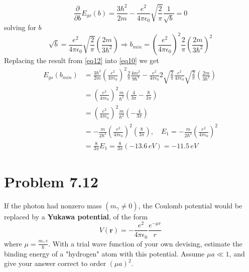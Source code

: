 \documentclass[12 pt]{article}
\numberwithin{equation}{section}
\begin{document}
\begin{enumerate}
  \begin{equation}\label{eq11}
    \frac{\partial}{\partial b} E_{gs}(b) = \frac{3\hbar^2}{2m} - \frac{e^2}{4\pi\epsilon_0}
    \sqrt{\frac{2}{\pi}}\frac{1}{\sqrt{b}} = 0
  \end{equation}
  solving for $b$
  \begin{equation}\label{eq12}
    \sqrt{b} = \frac{e^2}{4\pi\epsilon_0}\sqrt{\frac{2}{\pi}}\left(\frac{2m}{3\hbar^2}\right)
    \Rightarrow b_{min} = \left(\frac{e^2}{4\pi\epsilon_0} \right)^2\frac{2}{\pi}
    \left(\frac{2m}{3\hbar^2}\right)^2
  \end{equation}
  Replacing the result from \autoref{eq12} into \autoref{eq10} we get 
  \begin{equation}\label{eq13}
  \begin{aligned}
  E_{gs}(b_{min}) &=  \frac{3\hbar^2}{2m} \left(\frac{e^2}{4\pi\epsilon_0} \right)^2\frac{2}{\pi}
    \frac{4m^2}{9\hbar^4}
  -\frac{e^2}{4\pi\epsilon_0}2\sqrt{\frac{2}{\pi}}\frac{e^2}{4\pi\epsilon_0}\sqrt{\frac{2}
  {\pi}}\left(\frac{2m}{3\hbar^2}\right)\\
                  &=\left(\frac{e^2}{4\pi\epsilon_0} \right)^2\frac{m}{\hbar^2}\left(\frac{4}{3\pi}
                  - \frac{8}{3\pi}\right)\\
                  &=\left(\frac{e^2}{4\pi\epsilon_0} \right)^2\frac{m}{\hbar^2}\left(-\frac{4}{3\pi}
                  \right)\\
                  &= -\frac{m}{2\hbar^2}\left(\frac{e^2}{4\pi\epsilon_0} \right)^2\left(
                  \frac{8}{3\pi}\right), \quad E_1 =-\frac{m}{2\hbar^2}
                  \left(\frac{e^2}{4\pi\epsilon_0} \right)^2\\
                  &= \boxed{\frac{8}{3\pi}E_1 =\frac{8}{3\pi}(-13.6\,eV) = -11.5\,eV}
  \end{aligned}
  \end{equation}
\end{enumerate}
\section{Problem 7.12}
If the photon had nonzero mass $(m_\gamma \neq 0)$, the Coulomb potential would be replaced by a 
\textbf{Yukawa potential}, of the form 
\begin{equation}\label{eq21}
  V(\mathbf{r}) = -\frac{e^2}{4\pi\epsilon_0}\frac{e^{-\mu r}}{r}
\end{equation}
where $\mu =\frac{m_\gamma\,c}{\hbar}$. With a trial wave function of your own devising, estimate 
the binding energy of a "hydrogen" atom with this potential. Assume $\mu a \ll 1$, and give your 
answer correct to order $(\mu a)^2$.
\end{document}

